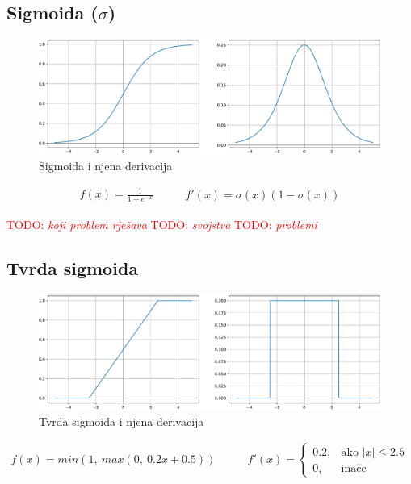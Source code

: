 \documentclass[times, utf8, numeric, diplomski]{fer}
\def\TODO#1{\noindent\textcolor{red}{TODO: \textit{#1}}\newline}
\def\todo#1{\TODO{#1}}
\begin{document}
\subsection{Sigmoida ($\sigma $)}

\begin{figure}[H]
\includegraphics[width=\textwidth]{Sigmoid.pdf}
\centering
\caption{Sigmoida i njena derivacija}
\label{fig:sigmoid}
\end{figure}

\begin{equation}
\label{eq:sigmoid}
\begin{split}
f(x) = \frac{1}{1+e^{-x}}
\end{split}
\qquad
\begin{split}
f'(x) = \sigma(x)(1-\sigma(x))
\end{split}
\end{equation}

\todo{koji problem rješava}
\todo{svojstva}
\todo{problemi}

\subsection{Tvrda sigmoida}

\begin{figure}[H]
\includegraphics[width=\textwidth]{Hard_sigmoid.pdf}
\centering
\caption{Tvrda sigmoida i njena derivacija}
\label{fig:hard_sigmoid}
\end{figure}

\begin{equation}
\label{eq:hsigmoid}
\begin{split}
f(x) = min(1,\ max(0,\ 0.2x + 0.5))
\end{split}
\qquad
\begin{split}
f'(x) = 
\begin{cases}
0.2,	 		& \text{ako } |x| \leq 2.5 \\
0,	& \text{inače}
\end{cases}
\end{split}
\end{equation}
\end{document}
